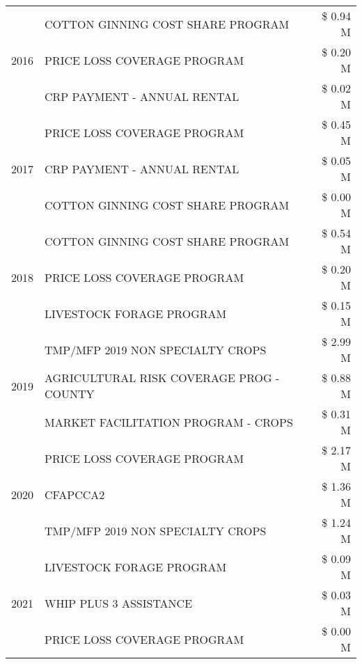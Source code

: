 \begin{tabular}{llr}
\cline{1-3}
\multirow[t]{3}{*}{2016} & COTTON GINNING COST SHARE PROGRAM & \$ 0.94 M \\
 & PRICE LOSS COVERAGE PROGRAM & \$ 0.20 M \\
 & CRP PAYMENT - ANNUAL RENTAL & \$ 0.02 M \\
\cline{1-3}
\multirow[t]{3}{*}{2017} & PRICE LOSS COVERAGE PROGRAM & \$ 0.45 M \\
 & CRP PAYMENT - ANNUAL RENTAL & \$ 0.05 M \\
 & COTTON GINNING COST SHARE PROGRAM & \$ 0.00 M \\
\cline{1-3}
\multirow[t]{3}{*}{2018} & COTTON GINNING COST SHARE PROGRAM & \$ 0.54 M \\
 & PRICE LOSS COVERAGE PROGRAM & \$ 0.20 M \\
 & LIVESTOCK FORAGE PROGRAM & \$ 0.15 M \\
\cline{1-3}
\multirow[t]{3}{*}{2019} & TMP/MFP 2019 NON SPECIALTY CROPS & \$ 2.99 M \\
 & AGRICULTURAL RISK COVERAGE PROG - COUNTY & \$ 0.88 M \\
 & MARKET FACILITATION PROGRAM - CROPS & \$ 0.31 M \\
\cline{1-3}
\multirow[t]{3}{*}{2020} & PRICE LOSS COVERAGE PROGRAM & \$ 2.17 M \\
 & CFAPCCA2 & \$ 1.36 M \\
 & TMP/MFP 2019 NON SPECIALTY CROPS & \$ 1.24 M \\
\cline{1-3}
\multirow[t]{3}{*}{2021} & LIVESTOCK FORAGE PROGRAM & \$ 0.09 M \\
 & WHIP PLUS 3 ASSISTANCE & \$ 0.03 M \\
 & PRICE LOSS COVERAGE PROGRAM & \$ 0.00 M \\
\cline{1-3}
\bottomrule
\end{tabular}
